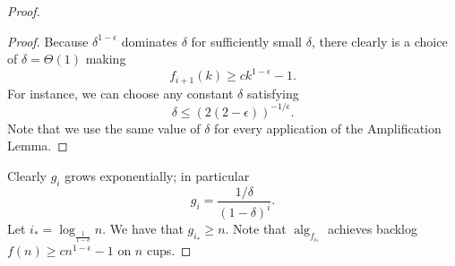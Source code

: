 \documentclass[twocolumn]{article}[10pt]
\DeclareMathOperator{\alg}{\text{alg}}
\begin{document}
\begin{proof}
\begin{proof}
  Because $\delta^{1-\epsilon}$ dominates $\delta$ for sufficiently small $\delta$, there clearly is a
  choice of $\delta = \Theta(1)$ making $$f_{i+1}(k) \ge ck^{1-\epsilon}-1.$$
  For instance, we can choose any constant $\delta$ satisfying
  $$\delta \le (2(2-\epsilon))^{-1/\epsilon}.$$
  Note that we use the same value of $\delta$ for every
  application of the Amplification Lemma.

  \end{proof}

  Clearly $g_{i}$ grows exponentially; in particular $$g_i = \frac{1/\delta}{(1-\delta)^i}.$$
  Let $i_* = \log_{\frac{1}{1-\delta}} n.$ We have that $g_{i_*} \ge n$.
  Note that $\alg_{f_{i_*}}$ achieves backlog $f(n) \ge cn^{1-\epsilon}-1$ on $n$ cups.



\end{proof}
\end{document}
